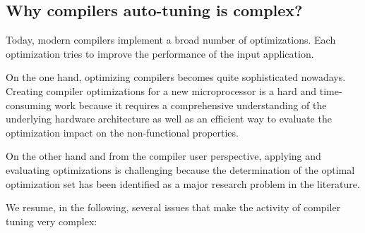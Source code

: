  
 
 

\subsection{Why compilers auto-tuning is complex?}
\label{sec:Why compilers auto-tuning is complex?}
Today, modern compilers implement a broad number of optimizations. Each optimization tries to improve the performance of the input application.

On the one hand, optimizing compilers becomes quite sophisticated nowadays. Creating compiler optimizations for a new microprocessor is a hard and time-consuming work because it requires a comprehensive understanding of the underlying hardware architecture as well as an efficient way to evaluate the optimization impact on the non-functional properties. 

On the other hand and from the compiler user perspective, applying and evaluating optimizations is challenging because the determination of the optimal optimization set has been identified as a major research problem in the literature\cite{knijnenburg2002iterative}.

We resume, in the following, several issues that make the activity of compiler tuning very complex:

